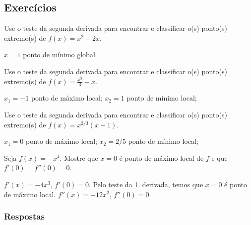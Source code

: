 \subsection{Exercícios}

\begin{exer}
  Use o teste da segunda derivada para encontrar e classificar o(s) ponto(s) extremo(s) de $f(x) = x^2 - 2x$.
\end{exer}
\begin{resp}
  $x=1$ ponto de mínimo global
\end{resp}

\begin{exer}
  Use o teste da segunda derivada para encontrar e classificar o(s) ponto(s) extremo(s) de $\displaystyle f(x) = \frac{x^3}{3}-x$.
\end{exer}
\begin{resp}
  $x_1=-1$ ponto de máximo local; $x_2=1$ ponto de mínimo local;
\end{resp}

\begin{exer}
  Use o teste da segunda derivada para encontrar e classificar o(s) ponto(s) extremo(s) de $\displaystyle f(x) = x^{2/3}(x-1)$.
\end{exer}
\begin{resp}
  $x_1=0$ ponto de máximo local; $x_2=2/5$ ponto de mínimo local;
\end{resp}

\begin{exer}
  Seja $f(x) = -x^4$. Mostre que $x=0$ é ponto de máximo local de $f$ e que $f'(0) = f''(0) = 0$.
\end{exer}
\begin{resp}
  $f'(x) = -4x^3$, $f'(0)=0$. Pelo teste da 1. derivada, temos que $x=0$ é ponto de máximo local. $f''(x) = -12x^2$, $f''(0)=0$.
\end{resp}

\ifisbook
\subsubsection{Respostas}
\shipoutAnswer
\fi
